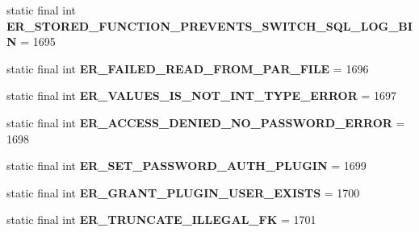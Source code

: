\begin{DoxyCompactItemize}
static final int {\bfseries E\+R\+\_\+\+S\+T\+O\+R\+E\+D\+\_\+\+F\+U\+N\+C\+T\+I\+O\+N\+\_\+\+P\+R\+E\+V\+E\+N\+T\+S\+\_\+\+S\+W\+I\+T\+C\+H\+\_\+\+S\+Q\+L\+\_\+\+L\+O\+G\+\_\+\+B\+IN} = 1695
\item 
\mbox{\label{classcom_1_1mysql_1_1jdbc_1_1_mysql_error_numbers_ac60a02400a634beb069c4020e02b838d}} 
static final int {\bfseries E\+R\+\_\+\+F\+A\+I\+L\+E\+D\+\_\+\+R\+E\+A\+D\+\_\+\+F\+R\+O\+M\+\_\+\+P\+A\+R\+\_\+\+F\+I\+LE} = 1696
\item 
\mbox{\label{classcom_1_1mysql_1_1jdbc_1_1_mysql_error_numbers_a7cb57f5b02c028cdb6cb68254c260614}} 
static final int {\bfseries E\+R\+\_\+\+V\+A\+L\+U\+E\+S\+\_\+\+I\+S\+\_\+\+N\+O\+T\+\_\+\+I\+N\+T\+\_\+\+T\+Y\+P\+E\+\_\+\+E\+R\+R\+OR} = 1697
\item 
\mbox{\label{classcom_1_1mysql_1_1jdbc_1_1_mysql_error_numbers_adf1e7c13604d6bf7b4f51d31497766df}} 
static final int {\bfseries E\+R\+\_\+\+A\+C\+C\+E\+S\+S\+\_\+\+D\+E\+N\+I\+E\+D\+\_\+\+N\+O\+\_\+\+P\+A\+S\+S\+W\+O\+R\+D\+\_\+\+E\+R\+R\+OR} = 1698
\item 
\mbox{\label{classcom_1_1mysql_1_1jdbc_1_1_mysql_error_numbers_ab8b089df3c47b39017acd5dafeb4292c}} 
static final int {\bfseries E\+R\+\_\+\+S\+E\+T\+\_\+\+P\+A\+S\+S\+W\+O\+R\+D\+\_\+\+A\+U\+T\+H\+\_\+\+P\+L\+U\+G\+IN} = 1699
\item 
\mbox{\label{classcom_1_1mysql_1_1jdbc_1_1_mysql_error_numbers_a60f9f422f539664a03522ec51646bacc}} 
static final int {\bfseries E\+R\+\_\+\+G\+R\+A\+N\+T\+\_\+\+P\+L\+U\+G\+I\+N\+\_\+\+U\+S\+E\+R\+\_\+\+E\+X\+I\+S\+TS} = 1700
\item 
\mbox{\label{classcom_1_1mysql_1_1jdbc_1_1_mysql_error_numbers_a4412a8d4160ef5dd3898fab8f5f96908}} 
static final int {\bfseries E\+R\+\_\+\+T\+R\+U\+N\+C\+A\+T\+E\+\_\+\+I\+L\+L\+E\+G\+A\+L\+\_\+\+FK} = 1701
\item 
\mbox{\label{classcom_1_1mysql_1_1jdbc_1_1_mysql_error_numbers_a4638a0044981fe1fd0115a3da512dca6}} 

\end{DoxyCompactItemize}
